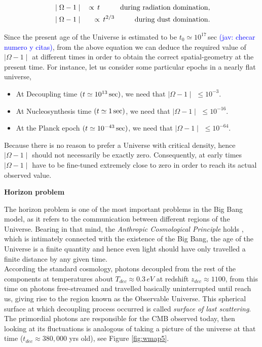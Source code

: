 \documentclass{rmaa}
\def\bea{\begin{eqnarray}}
\def\eea{\end{eqnarray}}
\newcommand{\jav}[1]{\textcolor{blue}{(jav: #1)}}
\begin{document}
\bea
&\mid \Omega-1\mid & \, \propto \, t  \hspace{1cm} {\rm during\,\,radiation\,\, domination},\nonumber \\ 
&\mid \Omega-1\mid & \, \propto \, t^{2/3}  \hspace{1cm} {\rm during\,\,dust\,\, domination}. \nonumber
\eea

\noindent
Since the present age of the Universe is estimated to be $t_0 \simeq 10^{17} 
\, $sec \citep{Larson} \jav{checar numero y citas}, from the above equation we can 
deduce the required value of $\mid \Omega-1\mid$ at different times in order to 
obtain the correct spatial-geometry at the present time. For instance, let us consider some 
particular epochs in a nearly flat universe,

\begin{itemize}
\item At Decoupling time  $(t \simeq 10^{13}\, {\rm sec})$, we need that $\mid \Omega-1 \mid$ $\le 10^{-3}$.
\item  At Nucleosynthesis time $(t \simeq 1\, {\rm sec})$, we need that $\mid \Omega-1 \mid$ $\le 10^{-16}$.
\item  At the Planck epoch $(t \simeq 10^{-43}\, {\rm sec})$, we need that $\mid \Omega-1 \mid$  $\le 10^{-64}$.
\end{itemize}
% 
%
Because there is no reason to prefer a Universe with critical density, hence
$\mid \Omega-1\mid$ should not necessarily be exactly zero. 
Consequently, at early times 
$\mid \Omega-1\mid$ have to be fine-tuned extremely close to zero in order to reach 
its actual observed value.



\vskip 16pt
\textbf{Horizon problem} 
\vskip 10pt

The horizon problem is one of the most important problems in the Big Bang model,
as it refers to the communication between different regions of the Universe. 
%
Bearing in that mind, the \textit{Anthropic Cosmological Principle} holds 
\citep{Barrow, Coles}, which is intimately connected
with the existence of the Big Bang, the age of the Universe is a finite quantity and hence
even light should have only travelled a finite distance by any given time. 
\\

According the standard cosmology, photons decoupled from the rest of the 
components at temperatures about $T_{dec}\approx 0.3\, eV$ at redshift
$z_{dec} \approx 1100$, from this time on photons free-streamed and travelled basically
 uninterrupted until reach us, giving rise to the region known as the Observable Universe.
 This spherical surface at which decoupling process occurred is called 
\textit{surface of last scattering}.
The primordial photons are responsible for the CMB observed today, then looking at its
fluctuations is analogous of taking a picture of the universe at that time 
($t_{dec}\approx 380,000$ yrs old), see Figure \ref{fig:wmap5}.
\\
\end{document}
